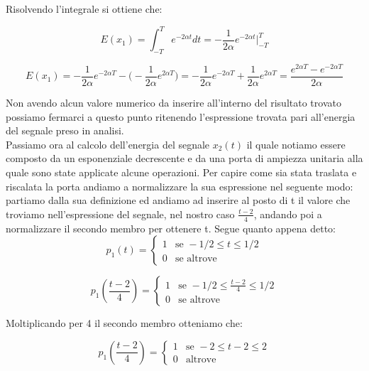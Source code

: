\documentclass[../main.tex]{subfiles}
\begin{document}
Risolvendo l'integrale si ottiene che:

\begin{equation}
	E(x_1) = \int_{-T}^{T}  e^{-2 \alpha t} dt  = -\frac{1}{2\alpha} e^{-2\alpha t} \bigg |_{-T}^T
\end{equation}

\begin{equation}
	E(x_1) = -\frac{1}{2\alpha} e^{-2\alpha T} - \bigg( -\frac{1}{2\alpha} e^{2\alpha T} \bigg) = -\frac{1}{2\alpha} e^{-2\alpha T} + \frac{1}{2\alpha} e^{2\alpha T} = \frac{e^{2\alpha T} - e^{-2\alpha T}}{2\alpha}
\end{equation}

Non avendo alcun valore numerico da inserire all'interno del risultato trovato possiamo fermarci a questo punto ritenendo l'espressione trovata pari all'energia del segnale preso in analisi.\\

Passiamo ora al calcolo dell'energia del segnale $x_2(t)$ il quale notiamo essere composto da un esponenziale decrescente e da una porta di ampiezza unitaria alla quale sono state applicate alcune operazioni.
Per capire come sia stata traslata e riscalata la porta andiamo a normalizzare la sua espressione nel seguente modo: partiamo dalla sua definizione ed andiamo ad inserire al posto di t il valore che troviamo nell'espressione del segnale, nel nostro caso $\frac{t-2}{4}$, andando poi a normalizzare il secondo membro per ottenere t. Segue quanto appena detto:\\

\begin{equation}
	p_1(t) = \begin{cases}
    1 & \text{se } -1/2 \leq t \leq 1/2 \\
    0 & \text{se altrove}
\end{cases}
\end{equation}

\begin{equation}
	p_1\left(\frac{t-2}{4}\right) = \begin{cases}
    1 & \text{se } -1/2 \leq \frac{t-2}{4} \leq 1/2 \\
    0 & \text{se altrove}
\end{cases} 
\end{equation}

Moltiplicando per 4 il secondo membro otteniamo che:

\begin{equation}
	p_1\left(\frac{t-2}{4}\right) = \begin{cases}
    1 & \text{se } -2 \leq t-2 \leq 2 \\
    0 & \text{altrove}
\end{cases} 
\end{equation}
\end{document}
